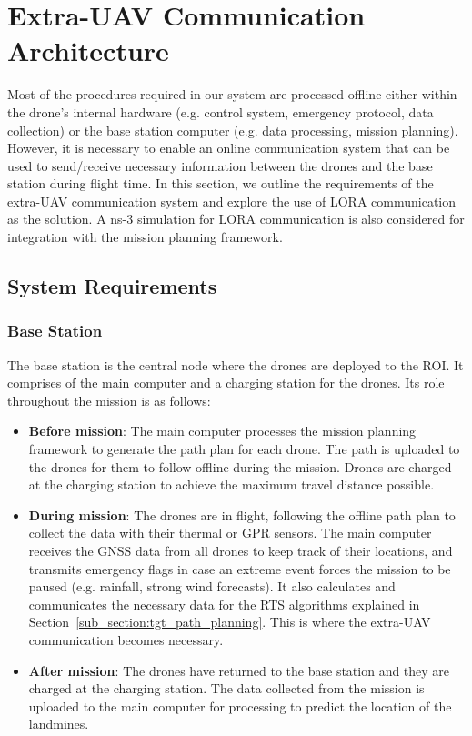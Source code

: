 \newpage
{}
\section{Extra-UAV Communication Architecture} \label{sec:euc}

Most of the procedures required in our system are processed offline either within the drone's internal hardware (e.g. control system, emergency protocol, data collection) or the base station computer (e.g. data processing, mission planning). However, it is necessary to enable an online communication system that can be used to send/receive necessary information between the drones and the base station during flight time. In this section, we outline the requirements of the extra-\gls{UAV} communication system and explore the use of \gls{LORA} communication as the solution. A ns-3 simulation for \gls{LORA} communication is also considered for integration with the mission planning framework. 

\subsection{System Requirements}
\label{sec:euc_requirements}

\subsubsection{Base Station}

The base station is the central node where the drones are deployed to the \gls{ROI}. It comprises of the main computer and a charging station for the drones. Its role throughout the mission is as follows:

\begin{itemize}
    \item \textbf{Before mission}: The main computer processes the mission planning framework to generate the path plan for each drone. The path is uploaded to the drones for them to follow offline during the mission. Drones are charged at the charging station to achieve the maximum travel distance possible. 
    \item \textbf{During mission}: The drones are in flight, following the offline path plan to collect the data with their thermal or \gls{GPR} sensors. The main computer receives the \gls{GNSS} data from all drones to keep track of their locations, and transmits emergency flags in case an extreme event forces the mission to be paused (e.g. rainfall, strong wind forecasts). It also calculates and communicates the necessary data for the \gls{RTS} algorithms explained in Section~\ref{sub_section:tgt_path_planning}. This is where the extra-\gls{UAV} communication becomes necessary. 
    \item \textbf{After mission}: The drones have returned to the base station and they are charged at the charging station. The data collected from the mission is uploaded to the main computer for processing to predict the location of the landmines. 
\end{itemize}

